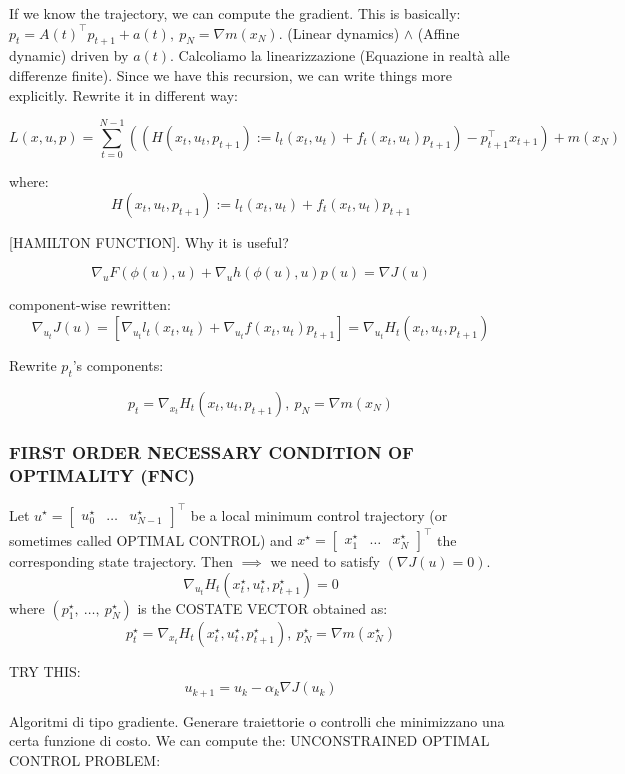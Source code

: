 If we know the trajectory, we can compute the gradient. This is basically: $p_t = A(t)^\top p_{t+1} + a(t),\ p_N=\nabla{m(x_N)}$. (Linear dynamics) $\land$ (Affine dynamic) driven by $a(t)$. Calcoliamo la linearizzazione (Equazione in realtà alle differenze finite). Since we have this recursion, we can write things more explicitly. Rewrite it in different way:

\[
	L(x,u,p) = \sum_{t=0}^{N-1}{((H(x_t,u_t,p_{t+1}) := l_t(x_t,u_t) + f_t(x_t,u_t)p_{t+1}) - p_{t+1}^\top x_{t+1})} + m(x_N)
\]

where:
\[
	H(x_t,u_t,p_{t+1}) := l_t(x_t,u_t) + f_t(x_t,u_t)p_{t+1}
\]

[HAMILTON FUNCTION]. Why it is useful? 

\[
	\nabla_u{F(\phi(u),u)} + \nabla_u{h(\phi(u),u)p(u)} = \nabla{J(u)}
\]

component-wise rewritten:
\[
	\nabla_{u_t}{J(u)} = [\nabla_{u_t}{l_t(x_t,u_t)} + \nabla_{u_t}{f(x_t,u_t)}p_{t+1}] = \nabla_{u_t}{H_t(x_t,u_t,p_{t+1})}
\]

Rewrite $p_t$'s components:

\[	
	p_t = \nabla_{x_t}{H_t(x_t,u_t,p_{t+1})},\ p_N = \nabla{m(x_N)}
\]

\subsubsection{FIRST ORDER NECESSARY CONDITION OF OPTIMALITY (FNC)}

Let $u^\star = \begin{bmatrix}u_0^\star&\dots&u_{N-1}^\star\end{bmatrix}^\top$ be a local minimum control trajectory (or sometimes called OPTIMAL CONTROL) and $x^\star = \begin{bmatrix}x_1^\star&\dots&x_N^\star\end{bmatrix}^\top$ the corresponding state trajectory. Then $\implies$ we need to satisfy $(\nabla{J(u)} = 0)$.
\[
	\nabla_{u_t}{H_t(x_t^\star,u_t^\star,p_{t+1}^\star)} = 0
\]
where $(p_1^\star,\ \dots,\ p_N^\star)$ is the COSTATE VECTOR obtained as:
\[
	p_t^\star = \nabla_{x_t}{H_t(x_t^\star,u_t^\star,p_{t+1}^\star)},\ p_N^\star = \nabla{m(x_N^\star)}
\]

TRY THIS:
\[
	u_{k+1} = u_k -\alpha_k\nabla{J(u_k)}
\]

Algoritmi di tipo gradiente. Generare traiettorie o controlli che minimizzano una certa funzione di costo. We can compute the: UNCONSTRAINED OPTIMAL CONTROL PROBLEM:

